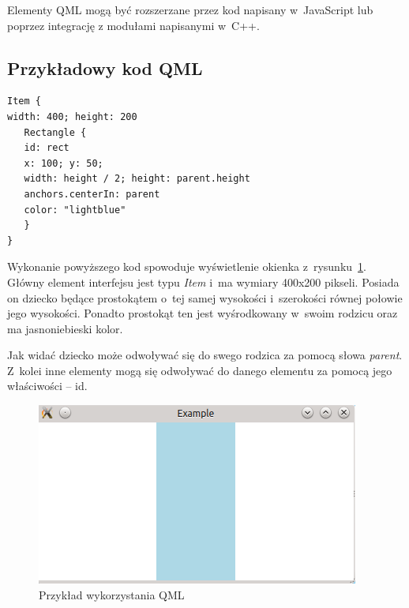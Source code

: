 Elementy QML mogą być rozszerzane przez kod napisany w~JavaScript lub poprzez integrację z modułami napisanymi w~C++.

\subsection{Przykładowy kod QML}

\begin{verbatim}
Item {
width: 400; height: 200
   Rectangle {
   id: rect
   x: 100; y: 50;
   width: height / 2; height: parent.height
   anchors.centerIn: parent
   color: "lightblue"
   }
}
\end{verbatim}

Wykonanie powyższego kod spowoduje wyświetlenie okienka z~rysunku~\ref{rys:qml}. Główny element interfejsu jest typu \textit{Item} i~ma wymiary 400x200 pikseli. Posiada on dziecko będące prostokątem o~tej samej wysokości i~szerokości równej połowie jego wysokości. Ponadto prostokąt ten jest wyśrodkowany w~swoim rodzicu oraz ma jasnoniebieski kolor.

Jak widać dziecko może odwoływać się do swego rodzica za pomocą słowa \textit{parent}. Z~kolei inne elementy mogą się odwoływać do danego elementu za pomocą jego właściwości -- id.

\begin{figure}
\centering
\caption{Przykład wykorzystania QML}\label{rys:qml}
\includegraphics[scale=0.8]{img/qml.png}
\end{figure}

